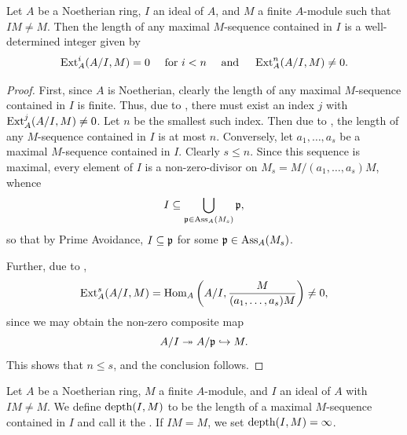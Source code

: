 \begin{theorem}[Rees]
    Let $A$ be a Noetherian ring, $I$ an ideal of $A$, and $M$ a finite $A$-module such that $IM\ne M$. Then the length of any maximal $M$-sequence contained in $I$ is a well-determined integer given by 
    \begin{equation*}
        \operatorname{Ext}^i_A(A/I, M) = 0\quad\text{ for } i < n\quad\text{ and }\quad\operatorname{Ext}^n_A(A/I, M)\ne 0.
    \end{equation*}
\end{theorem}
\begin{proof}
    First, since $A$ is Noetherian, clearly the length of any maximal $M$-sequence contained in $I$ is finite. Thus, due to , there must exist an index $j$ with $\operatorname{Ext}^j_A(A/I, M)\ne 0$. Let $n$ be the smallest such index. Then due to , the length of any $M$-sequence contained in $I$ is at most $n$. Conversely, let $a_1,\dots,a_s$ be a maximal $M$-sequence contained in $I$. Clearly $s\le n$. Since this sequence is maximal, every element of $I$ is a non-zero-divisor on $M_s = {M}/{(a_1,\dots,a_s)M}$, whence 
    \begin{equation*}
        I\subseteq\bigcup_{\mathfrak{p}\in\operatorname{Ass}_A(M_s)}\mathfrak{p},
    \end{equation*}
    so that by Prime Avoidance, $I\subseteq\mathfrak{p}$ for some $\mathfrak{p}\in\operatorname{Ass}_A(M_s)$.

    Further, due to ,
    \begin{equation*}
        \operatorname{Ext}^s_A(A/I, M) = \operatorname{Hom}_A\left(A/I, \frac{M}{(a_1,\dots,a_s)M}\right)\ne 0,
    \end{equation*}
    since we may obtain the non-zero composite map
    \begin{equation*}
        A/I\twoheadrightarrow A/\mathfrak{p}\hookrightarrow M.
    \end{equation*}
    This shows that $n\le s$, and the conclusion follows.
\end{proof}

\begin{definition}
    Let $A$ be a Noetherian ring, $M$ a finite $A$-module, and $I$ an ideal of $A$ with $IM\ne M$. We define $\operatorname{depth}(I, M)$ to be the length of a maximal $M$-sequence contained in $I$ and call it the . If $IM = M$, we set $\operatorname{depth}(I, M) = \infty$.
\end{definition}

